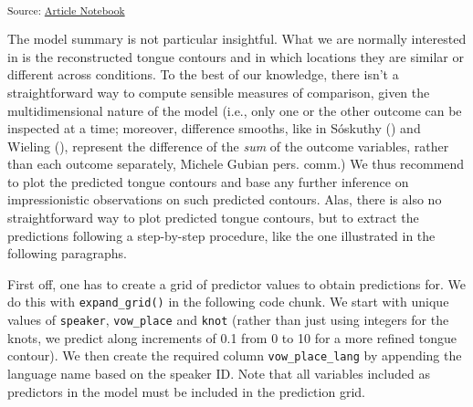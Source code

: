 \documentclass[
  man,
  longtable,
  nolmodern,
  notxfonts,
  notimes,
  colorlinks=true,linkcolor=blue,citecolor=blue,urlcolor=blue]{apa7}
\begin{document}
\textsubscript{Source:
\href{https://stefanocoretta.github.io/mv_uti/index.qmd.html}{Article
Notebook}}

The model summary is not particular insightful. What we are normally
interested in is the reconstructed tongue contours and in which
locations they are similar or different across conditions. To the best
of our knowledge, there isn't a straightforward way to compute sensible
measures of comparison, given the multidimensional nature of the model
(i.e., only one or the other outcome can be inspected at a time;
moreover, difference smooths, like in Sóskuthy
() and Wieling
(), represent the difference of the
\emph{sum} of the outcome variables, rather than each outcome
separately, Michele Gubian pers. comm.) We thus recommend to plot the
predicted tongue contours and base any further inference on
impressionistic observations on such predicted contours. Alas, there is
also no straightforward way to plot predicted tongue contours, but to
extract the predictions following a step-by-step procedure, like the one
illustrated in the following paragraphs.

First off, one has to create a grid of predictor values to obtain
predictions for. We do this with \texttt{expand\_grid()} in the
following code chunk. We start with unique values of \texttt{speaker},
\texttt{vow\_place} and \texttt{knot} (rather than just using integers
for the knots, we predict along increments of 0.1 from 0 to 10 for a
more refined tongue contour). We then create the required column
\texttt{vow\_place\_lang} by appending the language name based on the
speaker ID. Note that all variables included as predictors in the model
must be included in the prediction grid.
\end{document}
